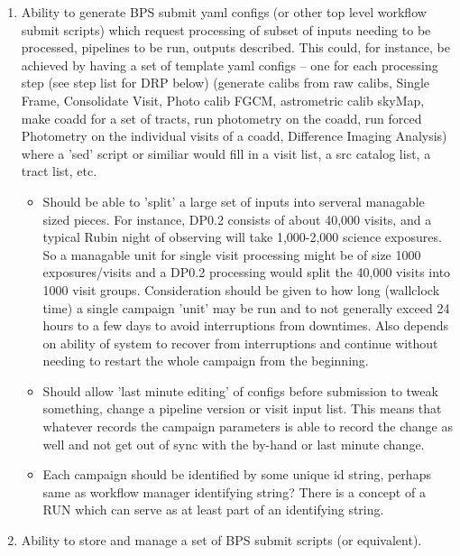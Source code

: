 \documentclass[DM,authoryear,toc]{lsstdoc}
\begin{document}
	\begin{enumerate}

	\item Ability to generate BPS submit yaml configs 
	(or other top level workflow submit scripts) which request processing
	of subset of inputs needing to be processed, pipelines to be run,
	outputs described.  This could, for instance, be achieved by having
	a set of template yaml configs -- one for each processing step (see step
	list for DRP below) (generate calibs from raw calibs, Single Frame, Consolidate Visit, 
	Photo calib FGCM, astrometric calib skyMap, 
	make coadd for a set of tracts, run photometry on the coadd,
	run forced Photometry on the individual visits of a coadd, Difference
	Imaging Analysis) where a 'sed' script or similiar would fill in
	a visit list, a src catalog list, a tract list, etc.

	\begin{itemize}

	\item Should be able to 'split' a large set of inputs into
	serveral managable sized pieces.  For instance, DP0.2 consists of
	about 40,000 visits, and a typical Rubin night of observing will
	take 1,000-2,000 science exposures.   So a managable unit for
	single visit processing might be of size 1000 exposures/visits and
	a DP0.2 processing would split the 40,000 visits into 1000 visit
	groups.  Consideration should be given to how long (wallclock time)
	a single campaign 'unit' may be run and to not generally exceed 
	24 hours to a few days to avoid interruptions from downtimes.
	Also depends on ability of system to recover from interruptions and
	continue without needing to restart the whole campaign from
	the beginning.
	

	\item  Should allow 'last minute editing' of configs before
	submission to tweak something, change a pipeline version or
	visit input list.  This means that whatever records the campaign
	parameters is able to record the change as well and not get
	out of sync with the by-hand or last minute change.

	\item Each campaign should be identified by some unique id string, 
	perhaps same as workflow manager identifying string?
	There is a concept of a RUN which can serve as at least part of an
	identifying string.

	\end{itemize}

	\item Ability to store and manage a set of BPS submit scripts 
	(or equivalent).


\end{enumerate}
\end{document}

